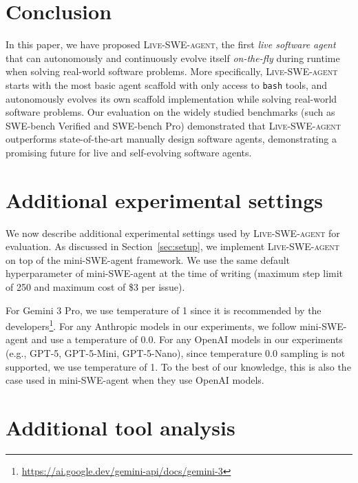 \documentclass{article}
\newcommand{\tech}{\textsc{Live-SWE-agent}\xspace}
\newcommand{\minisweagent}{mini-SWE-agent\xspace}
\newcommand{\livesweagent}{\textsc{Live-SWE-agent}\xspace}
\newcommand{\swebench}{SWE-bench\xspace}
\newcommand{\gptfivemini}{GPT-5-Mini\xspace}
\newcommand{\gptfive}{GPT-5\xspace}
\newcommand{\gptfivenano}{GPT-5-Nano\xspace}
\newcommand{\geminithreepro}{Gemini 3 Pro\xspace}
\begin{document}
\section{Conclusion}

In this paper, we have proposed \livesweagent, the first \emph{live software agent} that can autonomously and continuously evolve itself \emph{on-the-fly} during runtime when solving real-world software problems. More specifically, \livesweagent starts with the most basic agent scaffold with only access to \texttt{bash} tools, and autonomously evolves its own scaffold implementation while solving real-world software problems. 
Our evaluation on the widely studied benchmarks (such as \swebench Verified and \swebench Pro) demonstrated that \livesweagent outperforms state-of-the-art manually design software agents, demonstrating a promising future for live and self-evolving software agents.





\clearpage
\newpage
\appendix


\section{Additional experimental settings}
\label{appendix:additional_experimental_settings}

We now describe additional experimental settings used by \tech for evaluation.
As discussed in Section~\ref{sec:setup}, we implement \tech on top of the \minisweagent framework.
We use the same default hyperparameter of \minisweagent at the time of writing (maximum step limit of 250 and maximum cost of \$3 per issue).

For \geminithreepro{}, we use temperature of 1 since it is recommended by the developers\footnote{\url{https://ai.google.dev/gemini-api/docs/gemini-3}}.
For any Anthropic models in our experiments, we follow \minisweagent and use a temperature of 0.0.
For any OpenAI models in our experiments (e.g., \gptfive, \gptfivemini, \gptfivenano), since temperature 0.0 sampling is not supported, we use temperature of 1.
To the best of our knowledge, this is also the case used in \minisweagent when they use OpenAI models.


\section{Additional tool analysis}
\label{appendix:tool_analysis}
\end{document}
